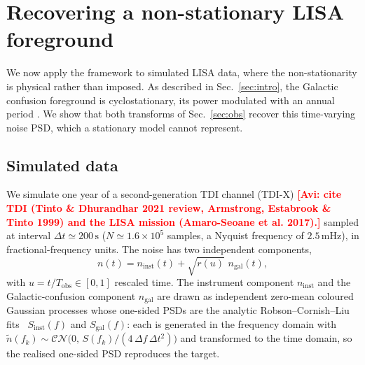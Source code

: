 \documentclass[
  aps,
  prd,
  twocolumn,
  amsmath,
  amssymb,
  nofootinbib,
  superscriptaddress,
  longbibliography,
]{revtex4-2}
\newcommand{\avi}[1]{\textcolor{red}{\textbf{[Avi: #1]}}}
\begin{document}
\section{Recovering a non-stationary LISA foreground}
\label{sec:lisa}

We now apply the framework to simulated LISA data, where the non-stationarity is
physical rather than imposed. As described in Sec.~\ref{sec:intro}, the Galactic
confusion foreground is cyclostationary, its power modulated with an annual period
\citep{digman2022cyclostationary}. We show that both transforms of
Sec.~\ref{sec:obs} recover this time-varying noise PSD, which a stationary model
cannot represent.

\subsection{Simulated data}
\label{sec:lisa_data}

We simulate one year of a second-generation TDI channel (TDI-X)
\avi{cite TDI (Tinto \& Dhurandhar 2021 review, Armstrong, Estabrook \& Tinto
1999) and the LISA mission (Amaro-Seoane et al. 2017).}
sampled at
interval $\Delta t \simeq 200\,\mathrm{s}$ ($N \simeq 1.6\times10^{5}$ samples, a
Nyquist frequency of $2.5\,\mathrm{mHz}$), in fractional-frequency units. The
noise has two independent components,
\begin{equation}
n(t) = n_{\mathrm{inst}}(t) + \sqrt{r(u)}\,\,n_{\mathrm{gal}}(t),
\label{eq:lisa_data}
\end{equation}
with $u = t/T_{\mathrm{obs}}\in[0,1]$ rescaled time. The instrument component
$n_{\mathrm{inst}}$ and the Galactic-confusion component $n_{\mathrm{gal}}$ are
drawn as independent zero-mean coloured Gaussian processes whose one-sided PSDs
are the analytic Robson--Cornish--Liu fits~\citep{robson2019sensitivity}
$S_{\mathrm{inst}}(f)$ and $S_{\mathrm{gal}}(f)$: each is generated in the
frequency domain with
$\tilde n(f_k) \sim \mathcal{CN}\!\big(0,\, S(f_k)/(4\,\Delta f\,\Delta t^2)\big)$
and transformed to the time domain, so the realised one-sided PSD reproduces the
target.
\end{document}
